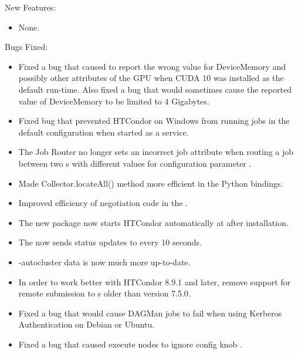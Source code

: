 \noindent New Features:

\begin{itemize}

\item None.

\end{itemize}

\noindent Bugs Fixed:

\begin{itemize}

\item Fixed a bug that caused  to report the wrong value
for DeviceMemory and possibly other attributes of the GPU when CUDA 10 was
installed as the default run-time.  Also fixed a bug that would sometimes cause
the reported value of DeviceMemory to be limited to 4 Gigabytes.

\item Fixed bug that prevented HTCondor on Windows from running jobs in the
default configuration when started as a service.

\item The Job Router no longer sets an incorrect  job
attribute when routing a job between two s with
different values for configuration parameter .

\item Made Collector.locateAll() method more efficient in the Python
bindings.

\item Improved efficiency of negotiation code in the .

\item The new  package now starts HTCondor automatically
at after installation.

\item The  now sends status updates to  every 10
seconds.

\item {} -autocluster data is now much more up-to-date.

\item In order to work better with HTCondor 8.9.1 and later, remove support
for remote submission to s older than version 7.5.0.

\item Fixed a bug that would cause DAGMan jobs to fail when using Kerberos Authentication on Debian or Ubuntu.

\item Fixed a bug that caused execute nodes to ignore config knob .

\end{itemize}

